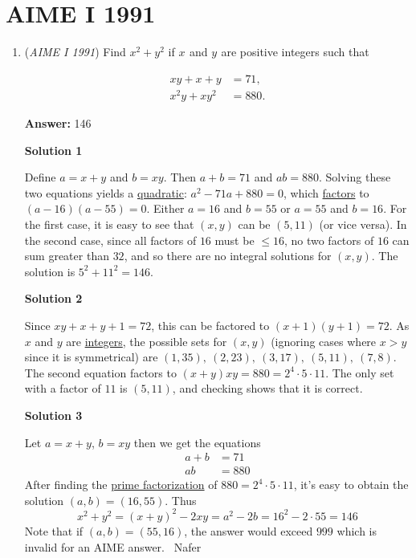 \section{AIME I 1991}
        \begin{enumerate}
        	\item (\textit{AIME I 1991}) Find $x^2+y^2_{}$ if $x_{}^{}$ and $y_{}^{}$ are positive integers such that

 \begin{align*} xy+x+y&=71, \\ x^2y+xy^2&=880. \end{align*}


 \textbf{Answer: }146



\textbf{Solution 1}

Define $a = x + y$ and $b = xy$. Then $a + b = 71$ and $ab = 880$. Solving these two equations yields a \href{https://artofproblemsolving.com/wiki/index.php?title=Quadratic\_equation}{quadratic}: $a^2 - 71a + 880 = 0$, which \href{https://artofproblemsolving.com/wiki/index.php?title=Factor}{factors} to $(a - 16)(a - 55) = 0$. Either $a = 16$ and $b = 55$ or $a = 55$ and $b = 16$. For the first case, it is easy to see that $(x,y)$ can be $(5,11)$ (or vice versa). In the second case, since all factors of $16$ must be $\le 16$, no two factors of $16$ can sum greater than $32$, and so there are no integral solutions for $(x,y)$. The solution is $5^2 + 11^2 = \boxed{146}$.

 



\textbf{Solution 2}

Since $xy + x + y + 1 = 72$, this can be factored to $(x + 1)(y + 1) = 72$. As $x$ and $y$ are \href{https://artofproblemsolving.com/wiki/index.php?title=Integer}{integers}, the possible sets for $(x,y)$ (ignoring cases where $x > y$ since it is symmetrical) are $(1, 35),\ (2, 23),\ (3, 17),\ (5, 11),\ (7,8)$. The second equation factors to $(x + y)xy = 880 = 2^4 \cdot 5 \cdot 11$. The only set with a factor of $11$ is $(5,11)$, and checking shows that it is correct.

 



\textbf{Solution 3}

Let $a=x+y$, $b=xy$ then we get the equations
 \begin{align*} a+b&=71\\ ab&=880 \end{align*}
After finding the \href{https://artofproblemsolving.com/wiki/index.php?title=Prime\_factorization}{prime factorization} of $880=2^4\cdot5\cdot11$, it's easy to obtain the solution $(a,b)=(16,55)$. Thus
 \[x^2+y^2=(x+y)^2-2xy=a^2-2b=16^2-2\cdot55=\boxed{146}\]Note that if $(a,b)=(55,16)$, the answer would exceed $999$ which is invalid for an AIME answer.~ Nafer


\end{enumerate}
